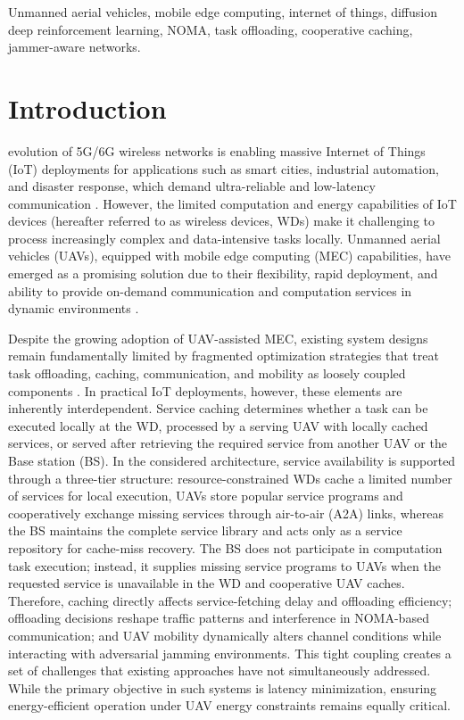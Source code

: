 \documentclass[journal]{IEEEtran}
\begin{document}
\begin{IEEEkeywords}
Unmanned aerial vehicles, mobile edge computing, 
internet of things, diffusion deep 
reinforcement learning, NOMA, task offloading, cooperative caching, jammer-aware 
networks.
\end{IEEEkeywords}

\section{Introduction}

 evolution of 5G/6G wireless networks is enabling massive Internet of Things (IoT) deployments for applications such as smart cities, industrial automation, and disaster response, which demand ultra-reliable and low-latency communication \cite{yin2025integrated}. However, the limited computation and energy capabilities of IoT devices (hereafter referred to as wireless devices, WDs) make it challenging to process increasingly complex and data-intensive tasks locally. Unmanned aerial vehicles (UAVs), equipped with mobile edge computing (MEC) capabilities, have emerged as a promising solution due to their flexibility, rapid deployment, and ability to provide on-demand communication and computation services 
in dynamic environments \cite{11020655, kang2023cooperative}.

Despite the growing adoption of UAV-assisted MEC, 
existing system designs remain fundamentally limited by fragmented optimization strategies that treat task 
offloading, caching, communication, and mobility as 
loosely coupled components \cite{10896833}. In practical IoT deployments, however, these elements are inherently 
interdependent. Service caching determines whether a 
task can be executed locally at the WD, processed by a 
serving UAV with locally cached services, or served after retrieving the required service from another UAV or the Base station (BS). In the considered architecture, service availability is supported through a three-tier structure: resource-constrained WDs cache a limited number of services for local execution, UAVs store popular service programs and cooperatively exchange missing services through air-to-air (A2A) links, 
whereas the BS maintains the complete service library and acts only as a service repository for cache-miss recovery. The BS does not participate in computation task execution; instead, it supplies missing service programs to UAVs when the requested service is unavailable in the WD and cooperative UAV caches. Therefore, caching directly affects service-fetching delay and offloading efficiency; offloading decisions reshape traffic patterns and interference in NOMA-based communication; and UAV mobility dynamically alters channel conditions while interacting with adversarial jamming environments. This tight coupling creates a set of challenges that existing approaches have not simultaneously addressed. While the primary objective in such systems is latency minimization, ensuring energy-efficient operation under UAV energy constraints remains equally critical.
\end{document}
